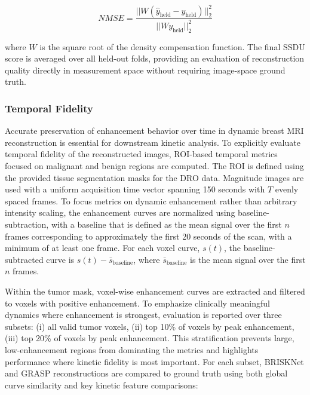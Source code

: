 \documentclass[runningheads]{llncs}
\begin{document}
\[
NMSE = \frac{||W(\hat{y}_{\text{held}} - y_{\text{held}})||_{2}^{2}}{||Wy_{\text{held}}||_{2}^{2}}
\]

where $W$ is the square root of the density compensation function. The final SSDU score is averaged over all held-out folds, providing an evaluation of reconstruction quality directly in measurement space without requiring image-space ground truth. 


\subsubsection{Temporal Fidelity}

Accurate preservation of enhancement behavior over time in dynamic breast MRI reconstruction is essential for downstream kinetic analysis. To explicitly evaluate temporal fidelity of the reconstructed images, ROI-based temporal metrics focused on malignant and benign regions are computed. The ROI is defined using the provided tissue segmentation masks for the DRO data. Magnitude images are used with a uniform acquisition time vector spanning 150 seconds with $T$ evenly spaced frames. To focus metrics on dynamic enhancement rather than arbitrary intensity scaling, the enhancement curves are normalized using baseline-subtraction, with a baseline that is defined as the mean signal over the first $n$ frames corresponding to approximately the first 20 seconds of the scan, with a minimum of at least one frame. For each voxel curve, $s(t)$, the baseline-subtracted curve is $s(t) - \bar{s}_{\text{baseline}}$, where $\bar{s}_{\text{baseline}}$ is the mean signal over the first $n$ frames. 

Within the tumor mask, voxel-wise enhancement curves are extracted and filtered to voxels with positive enhancement. To emphasize clinically meaningful dynamics where enhancement is strongest, evaluation is reported over three subsets: (i) all valid tumor voxels, (ii) top 10\% of voxels by peak enhancement, (iii) top 20\% of voxels by peak enhancement. This stratification prevents large, low-enhancement regions from dominating the metrics and highlights performance where kinetic fidelity is most important. For each subset, BRISKNet and GRASP reconstructions are compared to ground truth using both global curve similarity and key kinetic feature comparisons:
\end{document}
